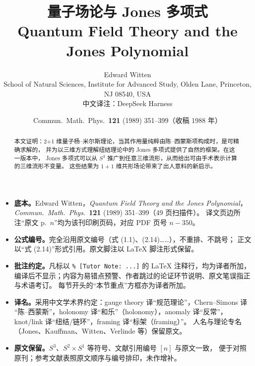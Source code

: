 \documentclass[11pt,a4paper]{article}
\begin{document}
\title{\bfseries 量子场论与 Jones 多项式\\[6pt]
       \large\normalfont Quantum Field Theory and the Jones Polynomial}
\author{Edward Witten\\
        {\small School of Natural Sciences, Institute for Advanced Study,
        Olden Lane, Princeton, NJ 08540, USA}\\[4pt]
        {\small 中文译注：DeepSeek Harness}}
\date{Commun.\ Math.\ Phys.\ \textbf{121} (1989) 351--399（收稿 1988 年）}
\maketitle

\begin{abstract}
本文证明：2+1 维量子杨–米尔斯理论，当其作用量纯粹由陈–西蒙斯项构成时，是可精确求解的，
并为以三维方式理解纽结理论中的 Jones 多项式提供了自然的框架。在这一版本中，
Jones 多项式可以从 $S^3$ 推广到任意三维流形，从而给出可由手术表示计算的三维流形不变量。
这些结果为 $1+1$ 维共形场论带来了出人意料的新启示。
\end{abstract}

\begin{tcolorbox}[enhanced, breakable, colback=gray!3!white, colframe=gray!55!black,
    boxrule=0.5pt, arc=2pt, left=8pt, right=8pt, top=5pt, bottom=5pt,
    title={\small\textbf{译者说明}}, fonttitle=\bfseries,
    coltitle=black, colbacktitle=gray!12!white, toptitle=1pt, bottomtitle=1pt]
\small
\begin{itemize}[leftmargin=1.2em, itemsep=2pt, topsep=0pt, parsep=0pt]
  \item \textbf{底本。}Edward Witten，\emph{Quantum Field Theory and the Jones Polynomial}，
        \emph{Commun.\ Math.\ Phys.}\ \textbf{121} (1989) 351--399（49 页扫描件）。
        译文页边所注“原文 p.~$n$”均为该刊印刷页码，对应 PDF 页号 $n-350$。
  \item \textbf{公式编号。}完全沿用原文编号（式 (1.1)、(2.14)……），不重排、不跳号；
        正文以“式 (2.14)”形式引用。原文脚注以 \LaTeX{} 脚注形式保留。
  \item \textbf{批注约定。}凡标以 \texttt{\% [Tutor Note: ...]} 的 LaTeX 注释行，均为译者所加，
        编译后不显示；内容为易错点预警、作者跳过的论证环节说明、原文笔误指正与术语考订。
        每节开头的“本节重点”方框亦为译者所加。
  \item \textbf{译名。}采用中文学术界约定：gauge theory 译“规范理论”，Chern--Simons 译
        “陈–西蒙斯”，holonomy 译“和乐”（holonomy），anomaly 译“反常”，
        knot/link 译“纽结/链环”，framing 译“标架（framing）”。
        人名与理论专名（Jones、Kauffman、Witten、Verlinde 等）保留原文。
  \item \textbf{原文保留。}$S^3$、$S^2\times S^1$ 等符号、文献引用编号 $[n]$ 与原文一致，
        便于对照原刊；参考文献表照原文顺序与编号排印，未作增补。
\end{itemize}
\end{tcolorbox}
\end{document}

